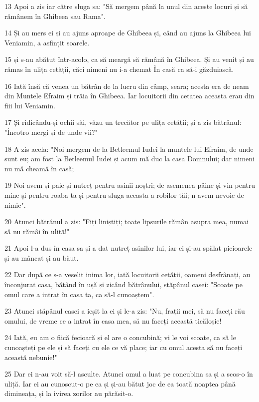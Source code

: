 \par 13 Apoi a zis iar către sluga sa: "Să mergem până la unul din aceste locuri și să rămânem în Ghibeea sau Rama".
\par 14 Și au mers ei și au ajuns aproape de Ghibeea și, când au ajuns la Ghibeea lui Veniamin, a asfințit soarele.
\par 15 și s-au abătut într-acolo, ca să meargă să rămână în Ghibeea. Și au venit și au rămas în ulița cetății, căci nimeni nu i-a chemat În casă ca să-i găzduiască.
\par 16 Iată însă că venea un bătrân de la lucru din câmp, seara; acesta era de neam din Muntele Efraim și trăia în Ghibeea. Iar locuitorii din cetatea aceasta erau din fiii lui Veniamin.
\par 17 Și ridicându-și ochii săi, văzu un trecător pe ulița cetății; și a zis bătrânul: "Încotro mergi și de unde vii?"
\par 18 A zis acela: "Noi mergem de la Betleemul Iudei la muntele lui Efraim, de unde sunt eu; am fost la Betleemul Iudei și acum mă duc la casa Domnului; dar nimeni nu mă cheamă în casă;
\par 19 Noi avem și paie și nutreț pentru asinii noștri; de asemenea pâine și vin pentru mine și pentru roaba ta și pentru sluga aceasta a robilor tăi; n-avem nevoie de nimic".
\par 20 Atunci bătrânul a zis: "Fiți liniștiți; toate lipsurile rămân asupra mea, numai să nu rămâi în uliță!"
\par 21 Apoi l-a dus în casa sa și a dat nutreț asinilor lui, iar ei și-au spălat picioarele și au mâncat și au băut.
\par 22 Dar după ce s-a veselit inima lor, iată locuitorii cetății, oameni desfrânați, au înconjurat casa, bătând în ușă și zicând bătrânului, stăpânul casei: "Scoate pe omul care a intrat în casa ta, ca să-l cunoaștem".
\par 23 Atunci stăpânul casei a ieșit la ei și le-a zis: "Nu, frații mei, să nu faceți rău omului, de vreme ce a intrat în casa mea, să nu faceți această ticăloșie!
\par 24 Iată, eu am o fiică fecioară și el are o concubină; vi le voi scoate, ca să le cunoașteți pe ele și să faceți cu ele ce vă place; iar cu omul acesta să nu faceți această nebunie!"
\par 25 Dar ei n-au voit să-l asculte. Atunci omul a luat pe concubina sa și a scos-o în uliță. Iar ei au cunoscut-o pe ea și și-au bătut joc de ea toată noaptea până dimineața, și la ivirea zorilor au părăsit-o.
